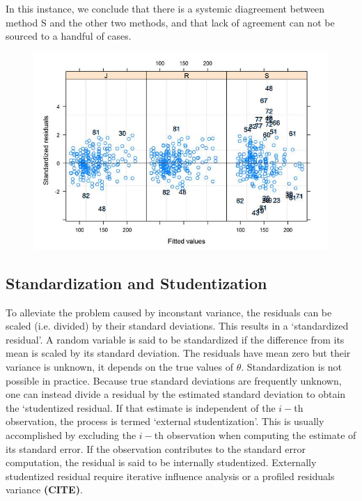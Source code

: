 \documentclass[12pt, a4paper]{report}
\theoremstyle{plain}
\theoremstyle{definition}
\theoremstyle{remark}
\begin{document}
In this instance, we conclude that there is a systemic diagreement between method S and the other two methods, and that lack of agreement can not be sourced to a handful of cases.
	\begin{figure}[h!]
		\centering
		\includegraphics[width=0.7\linewidth]{images/bloodnlmeResidPlot2B}
	\end{figure}
	 

	
\subsection{Standardization and Studentization} %
To alleviate the problem caused by inconstant variance, the residuals can be scaled (i.e. divided) by their standard deviations. This results in a `standardized residual'. A random variable is said to be standardized if the difference from its mean is scaled by its standard deviation. The residuals  have mean zero but their variance is unknown, it depends on the true values of $\theta$. Standardization is  not possible in practice. Because true standard deviations are frequently unknown, one can instead divide a residual by the estimated standard deviation to obtain the `studentized residual. 
If that estimate is independent of the $i-$th observation, the process is termed `external studentization'. This is usually accomplished by excluding the $i-$th observation when computing the estimate of its standard error. If the observation contributes to the
	standard error computation, the residual is said to be internally studentized.
	Externally  studentized residual require iterative influence analysis or a profiled residuals variance \textbf{(CITE)}.
	
\end{document}
